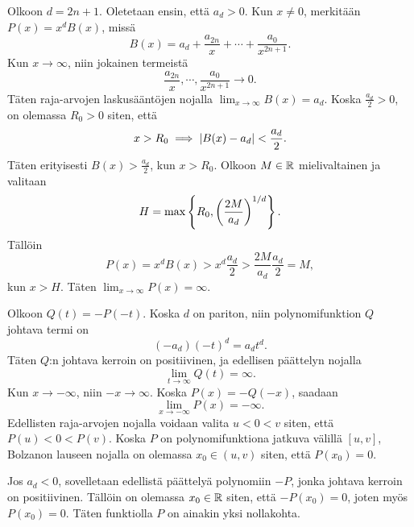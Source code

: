\documentclass[11pt,a4paper]{amsart}
\begin{document}
\begin{solution}
  Olkoon \(d = 2n + 1\). Oletetaan ensin, että \(a_d > 0\).
  Kun \(x \ne 0\), merkitään \(P(x) = x^dB(x)\), missä
  \[
    B(x) = a_d + \frac{a_{2n}}{x} + \cdots + \frac{a_0}{x^{2n + 1}}.
  \]
  Kun \(x \to \infty\), niin jokainen termeistä
  \[
    \frac{a_{2n}}{x}, \cdots, \frac{a_0}{x^{2n + 1}} \to 0.
  \]
  Täten raja-arvojen laskusääntöjen nojalla \(\lim_{x \to \infty} B(x) = a_d\).
  Koska \(\frac{a_d}{2} > 0\), on olemassa \(R_0 > 0\) siten, että
  \[
    x > R_0 \implies \lvert B(x) - a_d\rvert < \frac{a_d}{2}.
  \]
  Täten erityisesti \(B(x) > \frac{a_d}{2}\), kun \(x > R_0\).
  Olkoon \(M \in \mathbb{R}\) mielivaltainen ja valitaan
  \[
    H = \max\left\lbrace R_0, \left(\frac{2M}{a_d}\right)^{1/d}\right\rbrace.
  \]
  Tällöin
  \[
    P(x) = x^dB(x) > x^d\frac{a_d}{2} > \frac{2M}{a_d}\frac{a_d}{2} = M,
  \]
  kun \(x > H\). Täten \(\lim_{x \to \infty} P(x) = \infty\).

  Olkoon \(Q(t) = -P(-t)\). Koska \(d\) on pariton, niin polynomifunktion \(Q\)
  johtava termi on
  \[
    (-a_d)(-t)^{d} = a_dt^d.
  \]
  Täten \(Q\):n johtava kerroin on positiivinen, ja edellisen päättelyn nojalla
  \[
    \lim_{t \to \infty} Q(t) = \infty.
  \]
  Kun \(x \to -\infty\), niin \(-x \to \infty\). Koska
  \(P(x) = -Q(-x)\), saadaan
  \[
    \lim_{x \to -\infty} P(x) = -\infty.
  \]
  Edellisten raja-arvojen nojalla voidaan valita \(u < 0 < v\) siten, että
  \(P(u) < 0 < P(v)\). Koska \(P\) on polynomifunktiona jatkuva välillä
  \([u, v]\), Bolzanon lauseen nojalla on olemassa \(x_0 \in (u, v)\)
  siten, että \(P(x_0) = 0\).

  Jos \(a_d < 0\), sovelletaan edellistä päättelyä polynomiin \(-P\),
  jonka johtava kerroin on positiivinen. Tällöin on olemassa
  \(x_0 \in \mathbb{R}\) siten, että \(-P(x_0) = 0\), joten myös \(P(x_0) = 0\).
  Täten funktiolla \(P\) on ainakin yksi nollakohta.
\end{solution}
\end{document}
